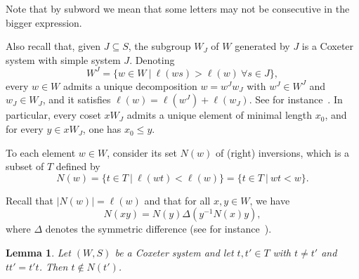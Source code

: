 \documentclass[11pt]{article}
\newtheorem{lemma}[theo]{Lemma}
\theoremstyle{definition}
\numberwithin{equation}{section}
\begin{document}
Note that by subword we mean that some letters may not be consecutive in the bigger expression. 

Also recall that, given $J\subseteq S$, the subgroup $W_J$ of $W$ generated by $J$ is a Coxeter system with simple system $J$. Denoting $$W^J=\{w\in W \ \vert \ \ell(ws)>\ell(w)~\forall s\in J\},$$ every $w\in W$ admits a unique decomposition $w=w^J w_J$ with $w^J\in W^J$ and $w_J \in W_J$, and it satisfies $\ell(w)=\ell(w^J)+\ell(w_J)$. See for instance~\cite[Section 2.4]{BB}. In particular, every coset $x W_J$ admits a unique element of minimal length $x_0$, and for every $y\in x W_J$, one has $x_0 \leq y$. 

To each element $w\in W$, consider its set $N(w)$ of (right) inversions, which is a subset of $T$ defined by $$N(w)=\{t\in T \ \vert \ \ell(wt)<\ell(w)\}=\{t\in T \ \vert \ wt<w\}.$$

Recall that $|N(w)|=\ell(w)$ and that for all $x,y\in W$, we have $$N(xy)=N(y)\Delta (y^{-1} N(x) y),$$ where $\Delta$ denotes the symmetric difference (see for instance~\cite[Chapter 1, Exercise 12]{BB}).

\begin{lemma}\label{lem_ref_commute}
	Let $(W,S)$ be a Coxeter system and let $t, t'\in T$ with $t\neq t'$ and $tt'=t't$. Then $t\notin N(t')$. 
\end{lemma}
\end{document}

